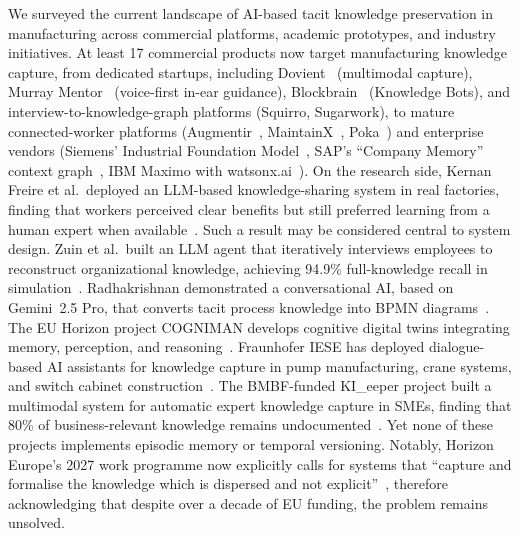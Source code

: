 \documentclass[]{ceurart}
\begin{document}
We surveyed the current landscape of AI-based tacit knowledge
preservation in manufacturing across commercial platforms, academic
prototypes, and industry initiatives. At least 17 commercial products now target manufacturing knowledge
capture, from dedicated startups, including Dovient~\cite{dovient2025} (multimodal capture), Murray Mentor~\cite{murraymentor2025} (voice-first
in-ear guidance), Blockbrain~\cite{blockbrain2026b} (Knowledge Bots), and interview-to-knowledge-graph
platforms (Squirro, Sugarwork), to mature connected-worker platforms (Augmentir~\cite{augmentir2025}, MaintainX~\cite{maintainx2025},
Poka~\cite{poka2025}) and enterprise vendors (Siemens'
Industrial Foundation Model~\cite{siemensifm2025}, SAP's ``Company Memory''
context graph~\cite{sapcompanymemory2025}, IBM Maximo with watsonx.ai~\cite{ibmmaximo2025}). On the research side, Kernan Freire et al.\ deployed an LLM-based
knowledge-sharing system in real factories, finding that workers
perceived clear benefits but still preferred learning from a human
expert when available~\cite{freire2024}. Such a result may be considered central
to system design. Zuin et al.\ built an LLM agent that iteratively
interviews employees to reconstruct organizational knowledge, achieving
94.9\% full-knowledge recall in simulation~\cite{zuin2025}.
Radhakrishnan demonstrated a conversational AI, based on Gemini~2.5 Pro, that
converts tacit process knowledge into BPMN diagrams~\cite{radhakrishnan2025}. The EU Horizon project COGNIMAN develops cognitive digital twins
integrating memory, perception, and reasoning~\cite{cogniman2025}.
Fraunhofer IESE has deployed dialogue-based AI assistants for knowledge
capture in pump manufacturing, crane systems, and switch cabinet
construction~\cite{fraunhoferiese2025}. The BMBF-funded KI\_eeper project built a multimodal
system for automatic expert knowledge capture in SMEs, finding that 80\%
of business-relevant knowledge remains undocumented~\cite{kieeper2025}.
Yet none of these projects implements episodic memory or temporal
versioning. Notably, Horizon Europe's 2027 work programme now explicitly
calls for systems that ``capture and formalise the knowledge which is
dispersed and not explicit''~\cite{horizon2027}, therefore acknowledging that
despite over a decade of EU funding, the problem remains unsolved.
\end{document}
